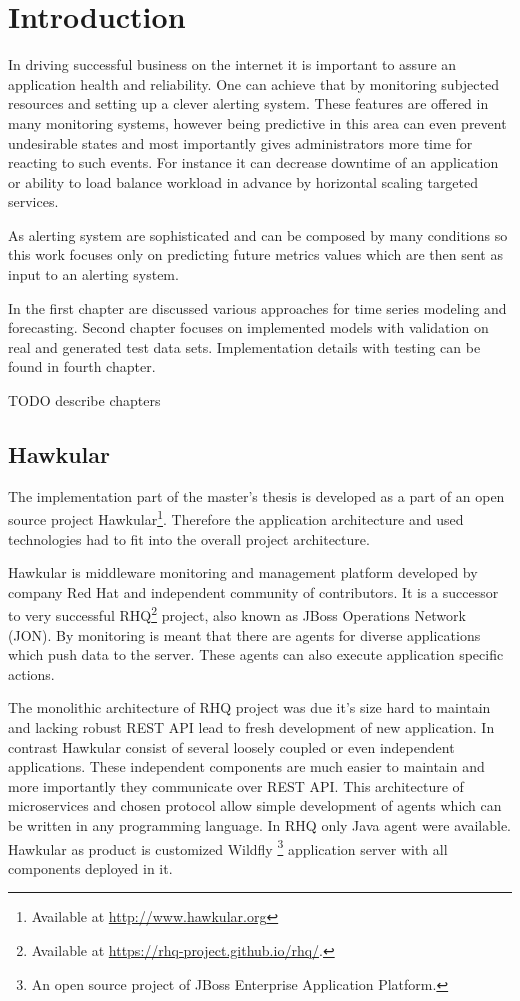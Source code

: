 
\chapter{Introduction}
In driving successful business on the internet it is important to assure an application
health and reliability. One can achieve that by monitoring subjected resources and setting
up a clever alerting system. These features are offered in many monitoring systems, however 
being predictive in this area can even prevent undesirable states and most importantly gives administrators more time for
reacting to such events. For instance it can decrease downtime of an application 
or ability to load balance workload in advance by horizontal scaling targeted services. 

As alerting system are sophisticated and can be composed by many conditions so this work
focuses only on predicting future metrics values which are then sent as input to an alerting system. 

In the first chapter are discussed various approaches for time series modeling and
forecasting. Second chapter focuses on implemented models with validation on real and 
generated test data sets. Implementation details with testing can be found in fourth chapter.

TODO describe chapters

    \section{Hawkular}
    The implementation part of the master's thesis is developed as a part of an open source project
    Hawkular\footnote{Available at \url{http://www.hawkular.org}}. 
    Therefore the application architecture and used technologies had to fit 
    into the overall project architecture.

    Hawkular is middleware monitoring and management platform
    developed by company Red Hat and independent community of contributors.
    It is a successor to very successful RHQ\footnote{Available at \url{https://rhq-project.github.io/rhq/}.}
    project, also known as JBoss Operations Network (JON).
    By monitoring is meant that there are agents for diverse applications which
    push data to the server. These agents can also execute application specific actions. 

    The monolithic architecture of RHQ project was due it's size hard to maintain 
    and lacking robust REST API lead to fresh development of new application.   
    In contrast Hawkular consist of several loosely coupled or even independent applications.
    These independent components are much
    easier to maintain and more importantly they communicate over REST API. This
    architecture of microservices and chosen protocol allow simple development of 
    agents which can be written in any programming language. In RHQ only Java agent were
    available. Hawkular as product is customized Wildfly
    \footnote{An open source project of JBoss Enterprise Application Platform.}
    application server with all components deployed in it.

